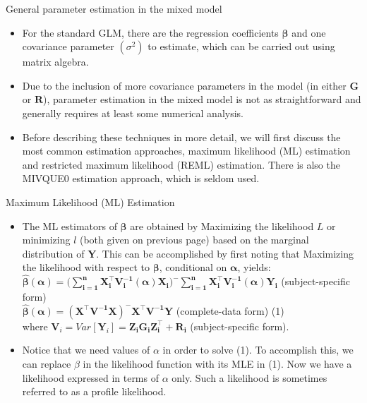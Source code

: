 \documentclass[
  9pt,
  ignorenonframetext,
]{beamer}
\begin{document}
\begin{frame}{General parameter estimation in the mixed model}
\protect\hypertarget{general-parameter-estimation-in-the-mixed-model}{}
\begin{itemize}
\item
  For the standard GLM, there are the regression coefficients
  \(\pmb \beta\) and one covariance parameter \((\sigma^2)\) to
  estimate, which can be carried out using matrix algebra.
\item
  Due to the inclusion of more covariance parameters in the model (in
  either \(\pmb G\) or \(\pmb R\)), parameter estimation in the mixed
  model is not as straightforward and generally requires at least some
  numerical analysis.
\item
  Before describing these techniques in more detail, we will first
  discuss the most common estimation approaches, maximum likelihood (ML)
  estimation and restricted maximum likelihood (REML) estimation. There
  is also the MIVQUE0 estimation approach, which is seldom used.
\end{itemize}
\end{frame}

\begin{frame}{Maximum Likelihood (ML) Estimation}
\protect\hypertarget{maximum-likelihood-ml-estimation}{}
\begin{itemize}
\item
  The ML estimators of \(\pmb \beta\) are obtained by Maximizing the
  likelihood \(L\) or minimizing \(l\) (both given on previous page)
  based on the marginal distribution of \(\pmb Y\). This can be
  accomplished by first noting that Maximizing the likelihood with
  respect to \(\pmb \beta\), conditional on \(\pmb \alpha\), yields:\\
  \(\pmb {\hat \beta(\alpha) = \big( \sum_{i=1}^nX_i^{\top}V_i^{-1}(\alpha)X_i \big)^{-}\sum_{i=1}^nX_i^{\top}V_i^{-1}(\alpha)Y_i}\)
  (subject-specific form)\\
  \(\pmb {\hat \beta(\alpha) = (X^{\top}V^{-1}X)^{-}X^{\top}V^{-1}Y}\)
  (complete-data form) (1)\\
  where \(\pmb V_i = Var[\pmb Y_i] = \pmb {Z_iG_iZ_i^{\top} + R_i}\)
  (subject-specific form).
\item
  Notice that we need values of \(\alpha\) in order to solve (1). To
  accomplish this, we can replace \(\beta\) in the likelihood function
  with its MLE in (1). Now we have a likelihood expressed in terms of
  \(\alpha\) only. Such a likelihood is sometimes referred to as a
  profile likelihood.
\end{itemize}
\end{frame}
\end{document}
